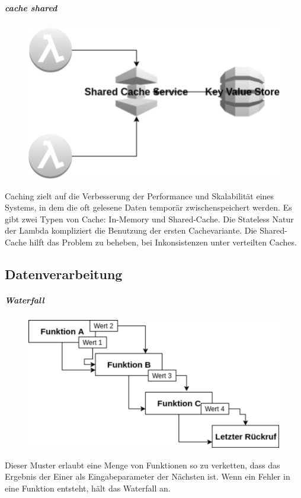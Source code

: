 \documentclass[
12pt,
english,
ngerman,
headsepline,
twoside,
openright,
numbers=noenddot,version=first
]{scrreprt}
\begin{document}
\subparagraph{cache shared }
\begin{figure}
	\includegraphics[scale=0.2]{./pics/aws/pattern-cache-shared.eps}
\end{figure}
Caching zielt auf die Verbesserung der Performance und Skalabilität eines Systems, in dem die oft gelesene Daten temporär zwischenspeichert werden. Es gibt zwei Typen von Cache: In-Memory und Shared-Cache. Die Stateless Natur der Lambda kompliziert die Benutzung der ersten Cachevariante. 
Die Shared-Cache hilft das Problem zu beheben, bei Inkonsistenzen unter verteilten Caches. 


\subsection{Datenverarbeitung}

\subparagraph{Waterfall}
\begin{figure}
	\includegraphics[scale=0.2]{./pics/aws/pattern-waterfall.eps}
\end{figure}
Dieser Muster erlaubt eine Menge von Funktionen so zu verketten, dass das Ergebnis der Einer als Eingabeparameter der Nächsten ist. Wenn ein Fehler in eine Funktion entsteht, hält das Waterfall an.
\end{document}
